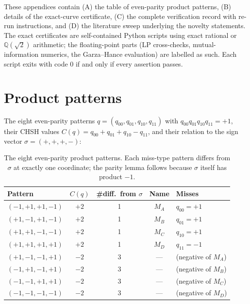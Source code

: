\documentclass[aps,pra,reprint,superscriptaddress,floatfix]{revtex4-2}
\begin{document}
\appendix
These appendices contain (A) the table of even-parity product patterns,
(B) details of the exact-curve certificate, (C) the complete
verification record with re-run instructions, and (D) the literature sweep
underlying the novelty statements. The exact certificates are
self-contained Python scripts using exact rational or
$\mathbb{Q}(\sqrt2)$ arithmetic; the floating-point parts (LP
cross-checks, mutual-information numerics, the Garza--Hance evaluation) are
labelled as such. Each script exits with code $0$ if and only if
every assertion passes.

\section{Product patterns}
\label{supp:patterns}

The eight even-parity patterns $q=(q_{00},q_{01},q_{10},q_{11})$ with
$q_{00}q_{01}q_{10}q_{11}=+1$, their CHSH values
$C(q)=q_{00}+q_{01}+q_{10}-q_{11}$, and their relation to the sign vector
$\sigma=(+,+,+,-)$:

\begin{table}[htbp]
\centering
\footnotesize
\begin{tabular}{@{}lcccl@{}}
\toprule
Pattern & $C(q)$ & \#diff.\ from $\sigma$ & Name & Misses \\ \midrule
$(-1,+1,+1,-1)$ & $+2$ & 1 & $M_A$ & $q_{00}=+1$\\
$(+1,-1,+1,-1)$ & $+2$ & 1 & $M_B$ & $q_{01}=+1$\\
$(+1,+1,-1,-1)$ & $+2$ & 1 & $M_C$ & $q_{10}=+1$\\
$(+1,+1,+1,+1)$ & $+2$ & 1 & $M_D$ & $q_{11}=-1$\\
$(+1,-1,-1,+1)$ & $-2$ & 3 & --- & (negative of $M_A$)\\
$(-1,+1,-1,+1)$ & $-2$ & 3 & --- & (negative of $M_B$)\\
$(-1,-1,+1,+1)$ & $-2$ & 3 & --- & (negative of $M_C$)\\
$(-1,-1,-1,-1)$ & $-2$ & 3 & --- & (negative of $M_D$)\\ \bottomrule
\end{tabular}
\caption{The eight even-parity product patterns. Each miss-type pattern
differs from $\sigma$ at exactly one coordinate; the parity lemma follows
because $\sigma$ itself has product $-1$.}
\label{tab:patterns}
\end{table}

\end{document}

